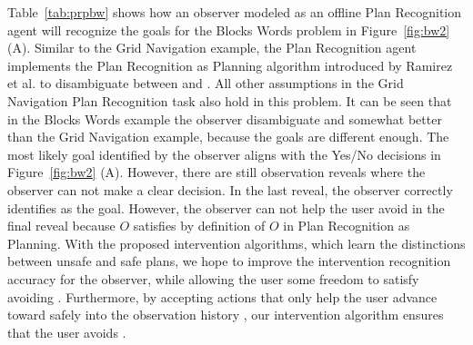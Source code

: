 Table~\ref{tab:prpbw} shows how an observer modeled as an offline Plan Recognition agent will recognize the goals for the Blocks Words problem in Figure~\ref{fig:bw2} (A). Similar to the Grid Navigation example, the Plan Recognition agent implements the Plan Recognition as Planning algorithm introduced by Ramirez et al. \citeyear{ramirez2010probabilistic} to disambiguate between \undesired and \desired. All other assumptions in the Grid Navigation Plan Recognition task also hold in this problem.
It can be seen that in the Blocks Words example the observer disambiguate  \undesired and \desired somewhat better than the Grid Navigation example, because the goals are different enough.
The most likely goal identified by the observer aligns with the Yes/No decisions in Figure~\ref{fig:bw2} (A). 
However, there are still observation reveals where the observer can not make a clear decision.
In the last reveal, the observer correctly identifies \undesired as the goal. However, the observer can not help the user avoid \undesired in the final reveal because $O$ satisfies \undesired by definition of $O$ in Plan Recognition as Planning. 
With the proposed intervention algorithms, which learn the distinctions between unsafe and safe plans, we hope to improve the intervention recognition accuracy for the observer, while allowing the user some freedom to satisfy \desired avoiding \undesired.
Furthermore, by accepting actions that only help the user advance toward \desired safely into the observation history \historyDef, our intervention algorithm ensures that the user avoids \undesired.

